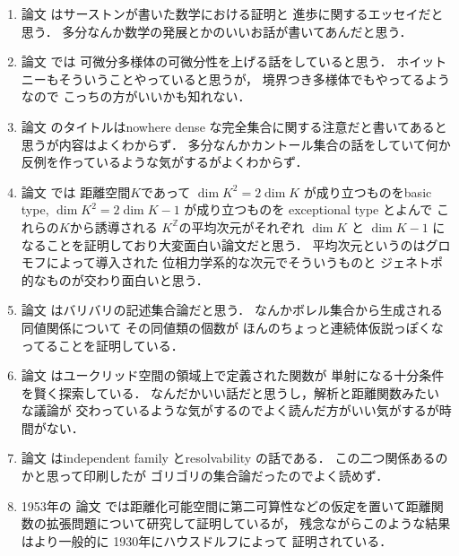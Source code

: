\documentclass[leqno, a4paper, 12pt]{jsarticle}
\newcommand{\zz}{\mathbb{Z}}
\begin{document}
\begin{enumerate}[label=(\arabic*)]
\item 
論文
\cite{MR1249357}
はサーストンが書いた数学における証明と
進歩に関するエッセイだと思う．
多分なんか数学の発展とかのいいお話が書いてあんだと思う．



\item 
論文
\cite{MR0195099}
では
可微分多様体の可微分性を上げる話をしていると思う．
ホイットニーもそういうことやっていると思うが，
境界つき多様体でもやってるようなので
こっちの方がいいかも知れない．



\item 

論文
\cite{MR1511870}
のタイトルはnowhere dense な完全集合に関する注意だと書いてあると思うが内容はよくわからず．
多分なんかカントール集合の話をしていて何か
反例を作っているような気がするがよくわからず．



\item 

論文
\cite{MR3941145}
では
距離空間$K$であって
$\dim K^{2}=2\dim K$
が成り立つものをbasic type, 
$\dim K^{2}=2\dim K-1$
が成り立つものを
exceptional type 
とよんで
これらの$K$から誘導される
$K^{\zz}$の平均次元がそれぞれ
$\dim K$
と
$\dim K-1$
になることを証明しており大変面白い論文だと思う．
平均次元というのはグロモフによって導入された
位相力学系的な次元でそういうものと
ジェネトポ的なものが交わり面白いと思う．



\item 
論文
\cite{MR0476524}
はバリバリの記述集合論だと思う．
なんかボレル集合から生成される同値関係について
その同値類の個数が
ほんのちょっと連続体仮説っぽくなってることを証明している．



\item 
論文
\cite{MR0565886}
はユークリッド空間の領域上で定義された関数が
単射になる十分条件を賢く探索している．
なんだかいい話だと思うし，解析と距離関数みたいな議論が
交わっているような気がするのでよく読んだ方がいい気がするが時間がない．




\item 
論文
\cite{MR2904087}
はindependent family とresolvability
の話である．
この二つ関係あるのかと思って印刷したが
ゴリゴリの集合論だったのでよく読めず．


\item 

1953年の
論文
\cite{MR0063022}
では距離化可能空間に第二可算性などの仮定を置いて距離関数の拡張問題について研究して証明しているが，
残念ながらこのような結果はより一般的に
1930年にハウスドルフによって
証明されている．




\end{enumerate}
\end{document}
